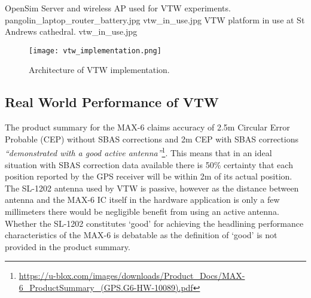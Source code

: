  {OpenSim Server and wireless AP used for VTW experiments.} {pangolin_laptop_router_battery.jpg}
       {vtw_in_use.jpg} {VTW platform in use at St Andrews cathedral.} {vtw_in_use.jpg}

\begin{figure}[h]
\centering
  \texttt{[image: vtw\_implementation.png]}
  \caption{Architecture of VTW implementation.}
  \label{vtw_implementation.png}
\end{figure}


\subsection{Real World Performance of VTW}

\newcommand{\ubloxcepFootnote}{\footnote{\url{https://u-blox.com/images/downloads/Product_Docs/MAX-6_ProductSummary_(GPS.G6-HW-10089).pdf}}}

\newcommand{\htconesFootnote}{\footnote{\url{http://www.htc.com/uk/smartphones/htc-one-s/}}}

\newcommand{\snapdragonFootnote}{\footnote{\url{https://www.qualcomm.com/products/snapdragon/processors/s4-s1}}}

\newcommand{\mytracksFootnote}{\footnote{\url{https://play.google.com/store/apps/details?id=com.google.android.maps.mytracks&hl=en}}}

\newcommand{\hausdorffFootnote}{\footnote{\url{http://postgis.net/docs/ST_HausdorffDistance.html}}}


The product summary for the MAX-6 claims accuracy of 2.5m Circular Error Probable (CEP) without SBAS corrections and 2m CEP with SBAS corrections \textit{``demonstrated with a good active antenna''}\ubloxcepFootnote{}. This means that in an ideal situation with SBAS correction data available there is 50\% certainty that each position reported by the GPS receiver will be within 2m of its actual position. The SL-1202 antenna used by VTW is passive, however as the distance between antenna and the MAX-6 IC itself in the hardware application is only a few millimeters there would be negligible benefit from using an active antenna. Whether the SL-1202 constitutes `good' for achieving the headlining performance characteristics of the MAX-6 is debatable as the definition of `good' is not provided in the product summary.

